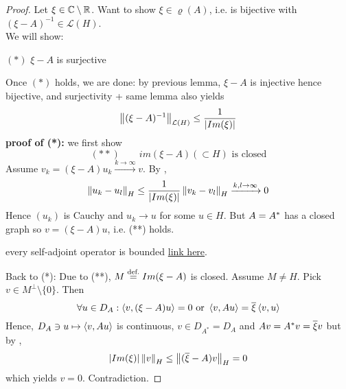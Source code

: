 \documentclass{article}
\begin{document}
\begin{proof}
		Let $\xi\in\mathbb{C}\setminus\mathbb{R}$. Want to show $\xi\in\varrho(A)$, i.e.  is bijective with $(\xi-A)^{-1}\in\mathcal{L}(H)$.\\
		We will show:\\
  \begin{center}
     		$(*)$ $\xi-A$ is surjective 
  \end{center}
		Once  $(*)$ holds, we are done: by previous lemma, $\xi-A$ is injective hence bijective, and surjectivity + same lemma also yields
		$$
			\left\|{(\xi-A)^{-1}}\right\|_{\mathcal{L}(H)}\leq\frac{1}{|Im(\xi)|}
		$$
		\textbf{proof of (*):} we first show
		$$
			(**)\qquad im(\xi-A)(\subset H) \text{  is closed}
		$$
		Assume $v_k=(\xi-A)u_k\xrightarrow{k\to\infty}v$. By ,
		$$
			\left\|{u_k-u_l}\right\|_H\leq\frac{1}{|Im(\xi)|}\left\|{v_k-v_l}\right\|_H\xrightarrow{k,l\to\infty}0$$
   Hence $(u_k)$ is Cauchy and $u_k\to u$ for some $u\in H$. But $A={A}^*$ has a closed graph so $v=(\xi-A)u$, i.e. (**) holds.\\ 
   \begin{unexaminable}
    every self-adjoint operator is bounded \href{https://math.stackexchange.com/questions/2602548/is-every-self-adjoint-operator-bounded}{link here}.
   \end{unexaminable}
   
		Back to (*): Due to (**), $M\stackrel{\text{def.}}{=} Im(\xi-A)$ is closed. Assume $M\neq H$. Pick $v\in M^\perp\setminus\{0\}$. Then
		$$
			\forall u\in D_A:\left<{v},{(\xi-A)u}\right>=0\text{  or  }\left<{v},{Au}\right>=\overline{\xi}\left<{v},{u}\right>$$
		Hence,
		$
			D_A\ni u\mapsto \left<{v},{Au}\right>
		$
		is continuous, $v\in D_{A^*}=D_A$ and $Av={A}^*v=\overline{\xi}v$
		but by ,
		$$|Im(\xi)|\left\|{v}\right\|_H\leq\left\|{(\overline{\xi}-A)v}\right\|_H=0$$
		which yields $v=0$. Contradiction.
  \end{proof}
 
\end{document}
